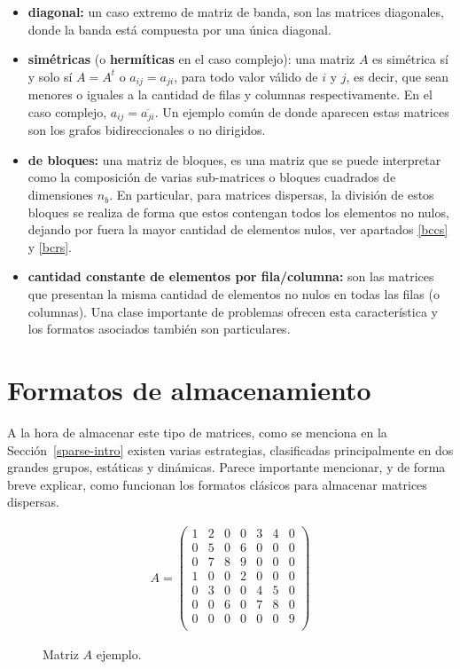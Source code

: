 \begin{itemize}
    \item \textbf{diagonal:} un caso extremo de matriz de banda, son las matrices diagonales, donde la banda está compuesta por una única diagonal.
    \item  \textbf{simétricas} (o \textbf{hermíticas} en el caso complejo):
    una matriz $A$ es simétrica sí y solo sí $A = A^t$ o $a_{i j} = a_{ji}$, para todo valor válido de $i$ y $j$, es decir, que sean menores o iguales a la cantidad de filas y columnas respectivamente. En el caso complejo, $a_{ij} = \overline{a_{ji}}$. Un ejemplo común de donde aparecen estas matrices son los grafos bidireccionales o no dirigidos.
    \item  \textbf{de bloques:}
    una matriz de bloques, es una matriz que se puede interpretar como la composición de varias sub-matrices o bloques cuadrados de dimensiones $n_b$. En particular, para matrices dispersas, la división de estos bloques se realiza de forma que estos contengan todos los elementos no nulos, dejando por fuera la mayor cantidad de elementos nulos, ver apartados \ref{bccs} y \ref{bcrs}.
    \item \textbf{cantidad constante de elementos por fila/columna:} son las matrices que presentan la misma cantidad de elementos no nulos en todas las filas (o columnas). Una clase importante de problemas ofrecen esta característica y los formatos asociados también son particulares.
    
\end{itemize}


\section{Formatos de almacenamiento}\label{formatos}

A la hora de almacenar este tipo de matrices, como se menciona en la Sección~\ref{sparse-intro} existen varias estrategias, clasificadas principalmente en dos grandes grupos, estáticas y dinámicas. Parece importante mencionar, y de forma breve explicar, como funcionan los formatos clásicos  para almacenar matrices dispersas.

\begin{figure}
\begin{center}
\begin{eqnarray*}
A = \left(
\begin{array}{ccccccc} 
1 & 2 & 0 & 0 & 3 & 4 & 0\\
0 & 5 & 0 & 6 & 0 & 0 & 0\\
0 & 7 & 8 & 9 & 0 & 0 & 0\\
1 & 0 & 0 & 2 & 0 & 0 & 0\\
0 & 3 & 0 & 0 & 4 & 5 & 0\\
0 & 0 & 6 & 0 & 7 & 8 & 0\\
0 & 0 & 0 & 0 & 0 & 0 & 9\\
\end{array}
\right)
\end{eqnarray*}
\end{center}
\caption{Matriz $A$ ejemplo.}
\label{A-matrix-example}
\end{figure}

